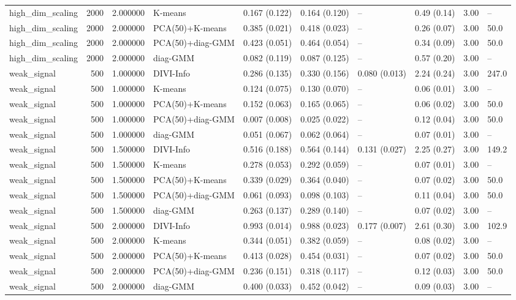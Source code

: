 \begin{tabular}{lrrlllllll}
high_dim_scaling & 2000 & 2.000000 & K-means & 0.167 (0.122) & 0.164 (0.120) & -- & 0.49 (0.14) & 3.00 & -- \\
high_dim_scaling & 2000 & 2.000000 & PCA(50)+K-means & 0.385 (0.021) & 0.418 (0.023) & -- & 0.26 (0.07) & 3.00 & 50.0 \\
high_dim_scaling & 2000 & 2.000000 & PCA(50)+diag-GMM & 0.423 (0.051) & 0.464 (0.054) & -- & 0.34 (0.09) & 3.00 & 50.0 \\
high_dim_scaling & 2000 & 2.000000 & diag-GMM & 0.082 (0.119) & 0.087 (0.125) & -- & 0.57 (0.20) & 3.00 & -- \\
weak_signal & 500 & 1.000000 & DIVI-Info & 0.286 (0.135) & 0.330 (0.156) & 0.080 (0.013) & 2.24 (0.24) & 3.00 & 247.0 \\
weak_signal & 500 & 1.000000 & K-means & 0.124 (0.075) & 0.130 (0.070) & -- & 0.06 (0.01) & 3.00 & -- \\
weak_signal & 500 & 1.000000 & PCA(50)+K-means & 0.152 (0.063) & 0.165 (0.065) & -- & 0.06 (0.02) & 3.00 & 50.0 \\
weak_signal & 500 & 1.000000 & PCA(50)+diag-GMM & 0.007 (0.008) & 0.025 (0.022) & -- & 0.12 (0.04) & 3.00 & 50.0 \\
weak_signal & 500 & 1.000000 & diag-GMM & 0.051 (0.067) & 0.062 (0.064) & -- & 0.07 (0.01) & 3.00 & -- \\
weak_signal & 500 & 1.500000 & DIVI-Info & 0.516 (0.188) & 0.564 (0.144) & 0.131 (0.027) & 2.25 (0.27) & 3.00 & 149.2 \\
weak_signal & 500 & 1.500000 & K-means & 0.278 (0.053) & 0.292 (0.059) & -- & 0.07 (0.01) & 3.00 & -- \\
weak_signal & 500 & 1.500000 & PCA(50)+K-means & 0.339 (0.029) & 0.364 (0.040) & -- & 0.07 (0.02) & 3.00 & 50.0 \\
weak_signal & 500 & 1.500000 & PCA(50)+diag-GMM & 0.061 (0.093) & 0.098 (0.103) & -- & 0.11 (0.04) & 3.00 & 50.0 \\
weak_signal & 500 & 1.500000 & diag-GMM & 0.263 (0.137) & 0.289 (0.140) & -- & 0.07 (0.02) & 3.00 & -- \\
weak_signal & 500 & 2.000000 & DIVI-Info & 0.993 (0.014) & 0.988 (0.023) & 0.177 (0.007) & 2.61 (0.30) & 3.00 & 102.9 \\
weak_signal & 500 & 2.000000 & K-means & 0.344 (0.051) & 0.382 (0.059) & -- & 0.08 (0.02) & 3.00 & -- \\
weak_signal & 500 & 2.000000 & PCA(50)+K-means & 0.413 (0.028) & 0.454 (0.031) & -- & 0.07 (0.02) & 3.00 & 50.0 \\
weak_signal & 500 & 2.000000 & PCA(50)+diag-GMM & 0.236 (0.151) & 0.318 (0.117) & -- & 0.12 (0.03) & 3.00 & 50.0 \\
weak_signal & 500 & 2.000000 & diag-GMM & 0.400 (0.033) & 0.452 (0.042) & -- & 0.09 (0.03) & 3.00 & -- \\
\bottomrule
\end{tabular}
